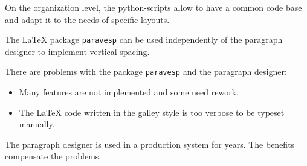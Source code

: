 \documentclass[]{ltugboat}
\begin{document}
On the organization level, the python-scripts allow to have a common code base and adapt it to the needs of specific layouts.

The \LaTeX{} package \verb|paravesp| can be used independently of the paragraph designer to implement vertical spacing.

There are problems with the package \verb|paravesp| and the paragraph designer:

\begin{itemize}
\item Many features are not implemented and some need rework.
\item The \LaTeX{} code written in the galley style is too verbose to be typeset manually.
\end{itemize}

The paragraph designer is used in a production system for years. The benefits compensate the problems.
\end{document}
